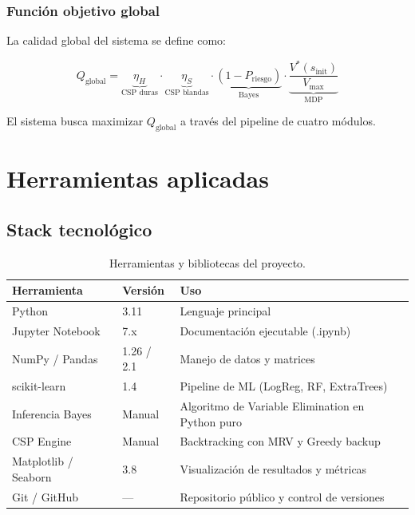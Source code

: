 \documentclass[12pt,twoside]{report}
\theoremstyle{definition}
\begin{document}
\subsection{Funci\'on objetivo global}

La calidad global del sistema se define como:

\begin{equation}
  Q_{\text{global}} = \underbrace{\eta_H}_{\text{CSP duras}} \cdot
  \underbrace{\eta_S}_{\text{CSP blandas}} \cdot
  \underbrace{(1 - P_{\text{riesgo}})}_{\text{Bayes}} \cdot
  \underbrace{\frac{V^*(s_{\text{init}})}{V_{\max}}}_{\text{MDP}}
  \label{eq:global}
\end{equation}

El sistema busca maximizar $Q_{\text{global}}$ a trav\'es del pipeline de cuatro m\'odulos.

\chapter{Herramientas aplicadas}
\label{ch:herramientas}

\section{Stack tecnol\'ogico}

\begin{table}[H]
\centering
\caption{Herramientas y bibliotecas del proyecto.}
\begin{tabular}{llp{7cm}}
\toprule
\textbf{Herramienta} & \textbf{Versi\'on} & \textbf{Uso} \\
\midrule
Python & 3.11 & Lenguaje principal \\
Jupyter Notebook & 7.x & Documentaci\'on ejecutable (.ipynb) \\
NumPy / Pandas & 1.26 / 2.1 & Manejo de datos y matrices \\
scikit-learn & 1.4 & Pipeline de ML (LogReg, RF, ExtraTrees) \\
Inferencia Bayes & Manual & Algoritmo de Variable Elimination en Python puro \\
CSP Engine & Manual & Backtracking con MRV y Greedy backup \\
Matplotlib / Seaborn & 3.8 & Visualizaci\'on de resultados y m\'etricas \\
Git / GitHub & --- & Repositorio p\'ublico y control de versiones \\
\bottomrule
\end{tabular}
\end{table}
\end{document}
